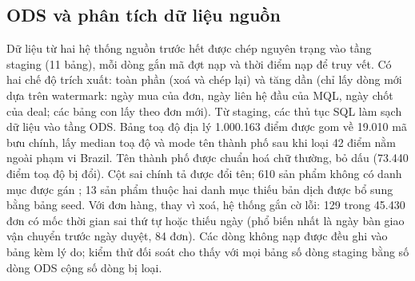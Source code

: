 \subsection{ODS và phân tích dữ liệu nguồn}
Dữ liệu từ hai hệ thống nguồn trước hết được chép nguyên trạng vào tầng staging (11 bảng), mỗi dòng gắn mã đợt nạp và thời điểm nạp để truy vết. Có hai chế độ trích xuất: toàn phần (xoá và chép lại) và tăng dần (chỉ lấy dòng mới dựa trên watermark: ngày mua của đơn, ngày liên hệ đầu của MQL, ngày chốt của deal; các bảng con lấy theo đơn mới). Từ staging, các thủ tục SQL làm sạch dữ liệu vào tầng ODS. Bảng toạ độ địa lý 1.000.163 điểm được gom về 19.010 mã bưu chính, lấy median toạ độ và mode tên thành phố sau khi loại 42 điểm nằm ngoài phạm vi Brazil. Tên thành phố được chuẩn hoá chữ thường, bỏ dấu (73.440 điểm toạ độ bị đổi). Cột sai chính tả  được đổi tên; 610 sản phẩm không có danh mục được gán ; 13 sản phẩm thuộc hai danh mục thiếu bản dịch được bổ sung bằng bảng seed. Với đơn hàng, thay vì xoá, hệ thống gắn cờ lỗi: 129 trong 45.430 đơn có mốc thời gian sai thứ tự hoặc thiếu ngày (phổ biến nhất là ngày bàn giao vận chuyển trước ngày duyệt, 84 đơn). Các dòng không nạp được đều ghi vào bảng  kèm lý do; kiểm thử đối soát cho thấy với mọi bảng số dòng staging bằng số dòng ODS cộng số dòng bị loại.


